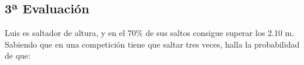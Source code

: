 \documentclass[addpoints,spanish, 12pt,a4paper]{exam}
\begin{document}
\begin{questions}
        
\section*{3ª Evaluación}    

\question[1] Luis es saltador de altura, y en el 70\% de sus saltos consigue superar los 2.10 m. Sabiendo que en una competición tiene que saltar tres veces, halla la probabilidad de que:
\begin{multicols}{2}

\end{multicols}        
        

\end{questions}
\end{document}
